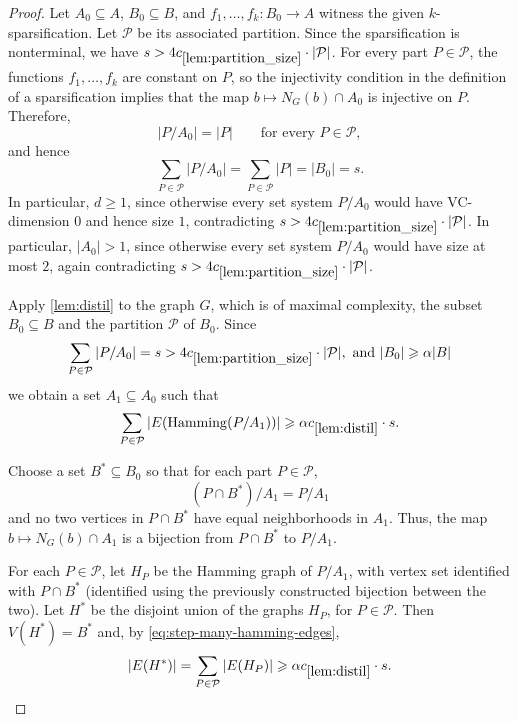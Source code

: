 \documentclass[11pt]{article}
\theoremstyle{definition}
\newcommand{\inducedSS}[2]{#1/#2}%
\renewcommand{\ge}{\geqslant}
\newcommand{\from}{\colon}
\renewcommand{\cal}{\mathcal}
\newcommand{\hamming}{\mathrm{Hamming}}
\begin{document}
\begin{proof}
Let $A_0\subseteq A$, $B_0\subseteq B$, and $f_1,\ldots,f_k\from B_0\to A$
witness the given $k$-sparsification.
Let $\cal P$ be its associated partition.
Since the sparsification is nonterminal, we have $s>4 c_{\ref{lem:partition_size}} \cdot |\cal P|$.
For every part $P\in\cal P$, the functions $f_1,\ldots,f_k$ are constant on $P$,
so the injectivity condition in the definition of a sparsification implies that
the map $b\mapsto N_G(b)\cap A_0$ is injective on $P$.
Therefore,
\[
  |\inducedSS{P}{A_0}|=|P|
  \qquad\text{for every }P\in\cal P,
\]
and hence
\[
  \sum_{P\in\cal P}|\inducedSS{P}{A_0}|=\sum_{P\in\cal P}|P|=|B_0|=s.
\]
In particular, $d\ge 1$, since otherwise every set system $\inducedSS{P}{A_0}$
would have VC-dimension $0$ and hence size $1$, contradicting
$s>4 c_{\ref{lem:partition_size}} \cdot |\cal P|$.
In particular, $|A_0|>1$, since otherwise every set system $\inducedSS{P}{A_0}$
would have size at most $2$, again contradicting $s>4 c_{\ref{lem:partition_size}} \cdot|\cal P|$.

Apply \cref{lem:distil} to the graph $G$, which is of maximal complexity, the subset $B_0 \subseteq B$ and the partition
$\cal P$ of $B_0$. Since
\[
  \sum_{P\in\cal P}|\inducedSS{P}{A_0}|=s>4 c_{\ref{lem:partition_size}} \cdot|\cal P|, \text{ and } |B_0| \ge \alpha |B|
\]
we obtain a set $A_1\subseteq A_0$ such that
\begin{equation}\label{eq:step-many-hamming-edges}
  \sum_{P\in\cal P}|E(\hamming(\inducedSS{P}{A_1}))|
  \ge \alpha c_{\ref{lem:distil}} \cdot s.
\end{equation}

Choose a set $B^*\subseteq B_0$ so that for each part $P\in\cal P$,
\[
  \inducedSS{(P\cap B^*)}{A_1}=\inducedSS{P}{A_1}
\]
and no two vertices in $P\cap B^*$ have equal neighborhoods in $A_1$.
Thus, the map $b\mapsto N_G(b)\cap A_1$ is a bijection from $P\cap B^*$ to
$\inducedSS{P}{A_1}$.

For each $P\in\cal P$, let $H_P$ be the Hamming graph of
$\inducedSS{P}{A_1}$, with vertex set identified with $P\cap B^*$ (identified using the previously constructed bijection between the two).
Let $H^*$ be the disjoint union of the graphs $H_P$, for $P\in\cal P$.
Then $V(H^*)=B^*$ and, by \eqref{eq:step-many-hamming-edges},
\[
  |E(H^*)|
  =\sum_{P\in\cal P}|E(H_P)|
  \ge \alpha c_{\ref{lem:distil}} \cdot s.
\]


\end{proof}
\end{document}
